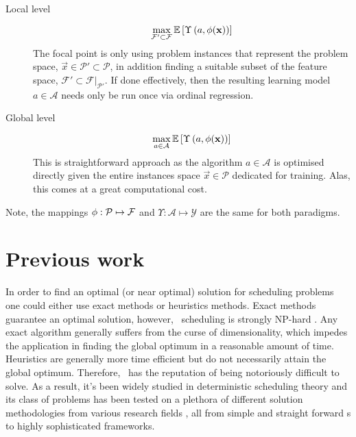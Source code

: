 \begin{description}
  \item[Local level] 
  \begin{equation}
    \max_{\mathcal{F}'\subset\mathcal{F}} 
    \mathbb{E}\left[\Upsilon\left(a,{\mathbf{\phi}}(\mathbf{x})\right)\right]
  \end{equation}
  The  focal point is only using  problem instances that represent the problem 
  space, $\vec{x}\in\mathcal{P'}\subset\mathcal{P}$, in addition finding a 
  suitable subset of the feature space, 
  $\mathcal{F}'\subset\mathcal{F}|_{\mathcal{P}'}$. If done effectively, then 
  the resulting learning model $a\in\mathcal{A}$ needs only be run once via 
  ordinal regression.
  \item[Global level]
  \begin{equation}
    \max_{a\in\mathcal{A}} 
    \mathbb{E}\left[\Upsilon\left(a,{\mathbf{\phi}}(\mathbf{x})\right)\right]
  \end{equation}
  This is  straightforward  approach as the algorithm $a\in\mathcal{A}$ is 
  optimised directly given the entire instances space $\vec{x}\in\mathcal{P}$ 
  dedicated for training. Alas, this comes at a great computational cost.
\end{description}
Note, the mappings ${\mathbf{\phi}}:\mathcal{P}\mapsto\mathcal{F}$ and 
$\Upsilon:\mathcal{A}\mapsto\mathcal{Y}$ are the same for both paradigms.

\section{Previous work}
In order to find an optimal (or near optimal) solution for scheduling problems 
one could either use exact methods or heuristics methods. Exact methods 
guarantee an optimal solution, however, \jsp\ scheduling is strongly NP-hard 
\citep{Garey76:NPhard}. Any exact algorithm generally suffers from the curse of 
dimensionality, which impedes the application in finding the global optimum in 
a reasonable amount of time. Heuristics are generally more time efficient but 
do not necessarily attain the global optimum. Therefore, \JSP\ has the 
reputation of being notoriously difficult to solve. As a result, it's 
been widely studied in deterministic scheduling theory and its class of 
problems has been tested on a plethora of different solution methodologies from 
various research fields \citep{Meeran12}, all from simple and straight forward 
\dr s to highly sophisticated frameworks.

